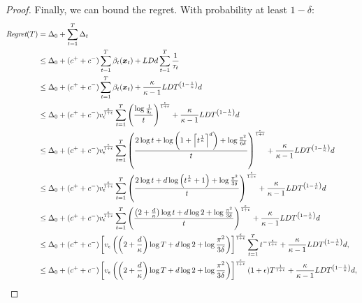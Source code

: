 \begin{proof}
	Finally, we can bound the regret. With probability at least $1-\delta$:
	\begin{align}
		\textit{Regret}(T) &= \Delta_0 + \sum_{t=1}^{T}\Delta_t \nonumber\\
		&\leq \Delta_0 +(c^{+}+c^{-})\sum_{t=1}^{T}\beta_t(\boldsymbol{x}_t) + LDd\sum_{t=1}^{T}\frac{1}{\tau_t} \label{pp:25}\\
		&\leq \Delta_0 +(c^{+}+c^{-})\sum_{t=1}^{T}\beta_t(\boldsymbol{x}_t) + \frac{\kappa }{\kappa-1}LDT^{\left(1-\frac{1}{\kappa}\right)}d\label{pp:26}\\
		&\leq \Delta_0 + (c^{+}+c^{-})v_{\epsilon}^{\frac{\epsilon}{1+\epsilon}}\sum_{t=1}^{T}\left(\frac{\log\frac{1}{\delta_t}}{t}\right)^{\frac{\epsilon}{1+\epsilon}} + \frac{\kappa }{\kappa-1}LDT^{\left(1-\frac{1}{\kappa}\right)}d\label{pp:27}\\
		&\leq \Delta_0 + (c^{+}+c^{-})v_{\epsilon}^{\frac{\epsilon}{1+\epsilon}}\sum_{t=1}^{T}\left(\frac{
			2\log t + \log\left(1+\left\lceil t^{\frac{1}{\kappa}}\right\rceil^d\right) + \log\frac{\pi^2}{6\delta}
		}{t}\right)^{\frac{\epsilon}{1+\epsilon}} + \frac{\kappa }{\kappa-1}LDT^{\left(1-\frac{1}{\kappa}\right)}d\label{pp:28}\\
		&\leq \Delta_0 + (c^{+}+c^{-})v_{\epsilon}^{\frac{\epsilon}{1+\epsilon}}\sum_{t=1}^{T}\left(\frac{
		2\log t + d\log \left(t^{\frac{1}{\kappa}}+1\right) + \log\frac{\pi^2}{3\delta}
		}{t}\right)^{\frac{\epsilon}{1+\epsilon}} + \frac{\kappa }{\kappa-1}LDT^{\left(1-\frac{1}{\kappa}\right)}d\label{pp:29}\\
		&\leq \Delta_0 + (c^{+}+c^{-})v_{\epsilon}^{\frac{\epsilon}{1+\epsilon}}\sum_{t=1}^{T}\left(\frac{
		\left(2+ \frac{d}{\kappa}\right)\log t + d\log 2 + \log\frac{\pi^2}{3\delta}
		}{t}\right)^{\frac{\epsilon}{1+\epsilon}} + \frac{\kappa }{\kappa-1}LDT^{\left(1-\frac{1}{\kappa}\right)}d\label{pp:30}\\
		&\leq \Delta_0 + (c^{+}+c^{-})\left[v_{\epsilon}
		\left(
		\left(2+ \frac{d}{\kappa}\right)\log T + d\log 2 + \log\frac{\pi^2}{3\delta}
		\right)\right]^{\frac{\epsilon}{1+\epsilon}}\sum_{t=1}^{T}t^{-\frac{\epsilon}{1+\epsilon}} + \frac{\kappa }{\kappa-1}LDT^{\left(1-\frac{1}{\kappa}\right)}d, \nonumber\\
		&\leq \Delta_0 + (c^{+}+c^{-})\left[v_{\epsilon}
		\left(
		\left(2+ \frac{d}{\kappa}\right)\log T + d\log 2 + \log\frac{\pi^2}{3\delta}
		\right)\right]^{\frac{\epsilon}{1+\epsilon}}(1+\epsilon)T^{\frac{1}{1+\epsilon}} + \frac{\kappa }{\kappa-1}LDT^{\left(1-\frac{1}{\kappa}\right)}d, \nonumber\\
	\end{align}

\end{proof}
